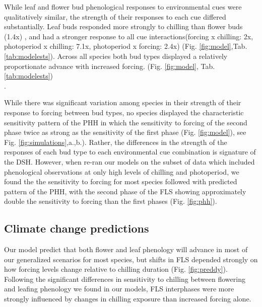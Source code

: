 \documentclass[11pt]{article}
\begin{document}
\noindent While leaf and flower bud phenological responses to environmental cues were qualitatively similar, the strength of their responses to each cue differed substantially. Leaf buds responded more strongly to chilling than flower buds (1.4x) , and had a stronger response to all cue interactions(forcing x chilling: 2x, photoperiod x chilling: 7.1x, photoperiod x forcing: 2.4x) (Fig. \ref{fig:model},Tab. \ref{tab:modelests}). Across all species both bud types displayed a relatively proportionate advance with increased forcing. (Fig. \ref{fig:model}, Tab. \ref{tab:modelests})\\. 

\noindent While there was significant variation among species in their strength of their response to forcing between bud types, no species displayed the characteristic sensitivity pattern of the PHH in which the sensitivity to forcing of the second phase twice as strong as the sensitivity of the first phase (Fig. \ref{fig:model}), see Fig. \ref{fig:simulations},a.,b.). Rather, the differences in the strength of the responses of each bud type to each environmental cue combination is signature of the DSH. However, when re-ran our models on the subset of data which included phenological observations at only high levels of chilling and photoperiod, we found the the sensitivity to forcing for most species followed with predicted pattern of the PHH, with the second phase of the FLS showing approximately double the sensitivity to forcing than the first phases (Fig. \ref{fig:phh}).\\ %

    \subsection*{Climate change predictions}
\noindent Our model predict that both flower and leaf phenology will advance in most of our generalized scenarios for most species, but shifts in FLS depended strongly on how forcing levels change relative to chilling duration (Fig. \ref{fig:preddy}). Following the significant differences in sensitivity to chilling between flowering and leafing phenology we found in our models, FLS interphases were more strongly influenced by changes in chilling exposure than increased forcing alone.\\
\end{document}
